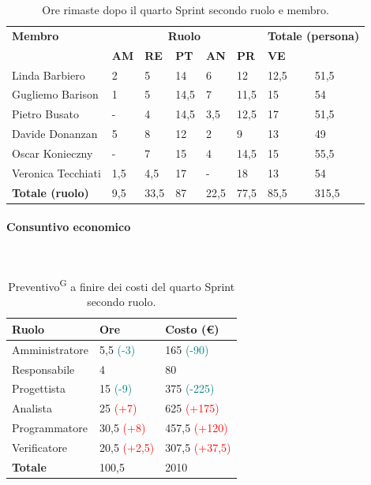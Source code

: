 \documentclass[8pt]{article}
\newcommand{\glossterm}[1]{#1\textsuperscript{G}} %
\newcommand{\subsubsubsection}[1]{\paragraph{#1}\mbox{}\\}
\begin{document}
\begin{table}[ht!]
	\centering
	\begin{tabular}{p{3cm} p{1.4cm} p{1.6cm} p{1.5cm} p{1.5cm} p{1.5cm} p{1.5cm} p{2cm}}
		\toprule
        \textbf{Membro} & \multicolumn{5}{c}{\textbf{Ruolo}} & \multicolumn{2}{r}{\textbf{Totale (persona)}}\\
		& \textbf{AM} & \textbf{RE} & \textbf{PT} & \textbf{AN} & \textbf{PR} & \textbf{VE}\\
		\midrule
        Linda Barbiero     & 2 & 5 & 14 & 6 & 12 & 12,5 & 51,5 \\
        Gugliemo Barison   & 1 & 5 & 14,5 & 7 & 11,5 & 15 & 54 \\
        Pietro Busato      & - & 4 & 14,5 & 3,5 & 12,5 & 17 & 51,5 \\
        Davide Donanzan    & 5 & 8 & 12 & 2 & 9 & 13 & 49 \\
        Oscar Konieczny    & - & 7 & 15 & 4 & 14,5 & 15 & 55,5 \\
        Veronica Tecchiati & 1,5 & 4,5 & 17 & - & 18 & 13 & 54 \\
        \midrule
        \textbf{Totale (ruolo)} & 9,5 & 33,5 & 87 & 22,5 & 77,5 & 85,5 & 315,5 \\
		\bottomrule
	\end{tabular}
	\caption{Ore rimaste dopo il quarto Sprint secondo ruolo e membro.}
	\label{table:Ore rimaste dopo il quarto Sprint secondo ruolo e membro.}
\end{table}
\subsubsubsection{Consuntivo economico}
\begin{table}[ht!]
    \centering
    \begin{tabular}{p{4cm} p{1.8cm} p{2.2cm}}
        \toprule
        \textbf{Ruolo} & \textbf{Ore} & \textbf{Costo (€)} \\
        \midrule
        Amministratore & 5,5 \textcolor{teal}{(-3)} & 165 \textcolor{teal}{(-90)} \\
        Responsabile & 4  & 80 \\
        Progettista & 15 \textcolor{teal}{(-9)}  & 375 \textcolor{teal}{(-225)} \\
        Analista & 25 \textcolor{red}{(+7)} & 625 \textcolor{red}{(+175)} \\
        Programmatore & 30,5 \textcolor{red}{(+8)} & 457,5 \textcolor{red}{(+120)} \\
        Verificatore & 20,5 \textcolor{red}{(+2,5)} & 307,5 \textcolor{red}{(+37,5)} \\
        \bottomrule
        \textbf{Totale} & 100,5 & 2010
    \end{tabular}
    \caption{\glossterm{Preventivo} a finire dei costi del quarto Sprint secondo ruolo.}
    \label{table:Preventivo a finire dei costi del quartoo Sprint secondo ruolo}
\end{table}
\end{document}
